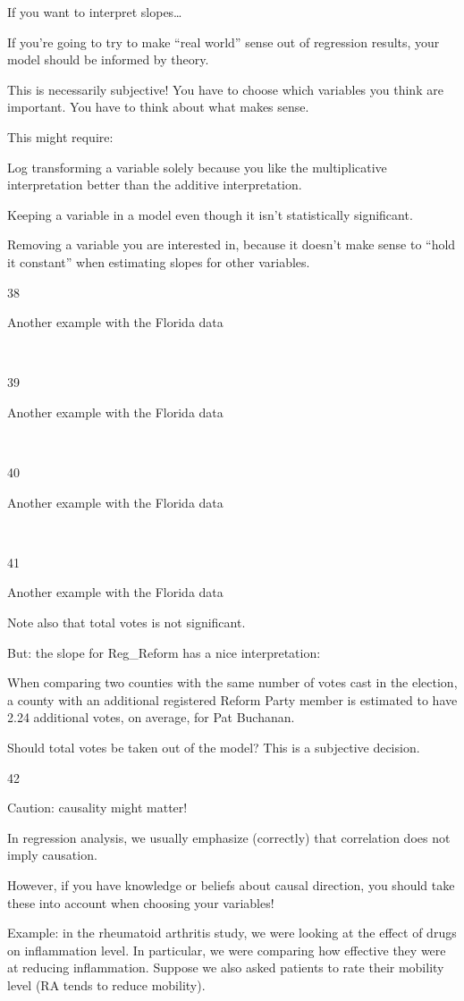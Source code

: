 \documentclass[
  letterpaper,
  DIV=11,
  numbers=noendperiod]{scrreprt}
\begin{document}
If you want to interpret slopes\ldots{}

If you're going to try to make ``real world'' sense out of regression
results, your model should be informed by theory.

This is necessarily subjective! You have to choose which variables you
think are important. You have to think about what makes sense.

This might require:

Log transforming a variable solely because you like the multiplicative
interpretation better than the additive interpretation.

Keeping a variable in a model even though it isn't statistically
significant.

Removing a variable you are interested in, because it doesn't make sense
to ``hold it constant'' when estimating slopes for other variables.

38

Another example with the Florida data

~

39

Another example with the Florida data

~

40

Another example with the Florida data

~

41

Another example with the Florida data

Note also that total votes is not significant.

But: the slope for Reg\_Reform has a nice interpretation:

When comparing two counties with the same number of votes cast in the
election, a county with an additional registered Reform Party member is
estimated to have 2.24 additional votes, on average, for Pat Buchanan.

Should total votes be taken out of the model? This is a subjective
decision.

42

Caution: causality might matter!

In regression analysis, we usually emphasize (correctly) that
correlation does not imply causation. 

However, if you have knowledge or beliefs about causal direction, you
should take these into account when choosing your variables!

Example: in the rheumatoid arthritis study, we were looking at the
effect of drugs on inflammation level. In particular, we were comparing
how effective they were at reducing inflammation. Suppose we also asked
patients to rate their mobility level (RA tends to reduce mobility).
\end{document}
